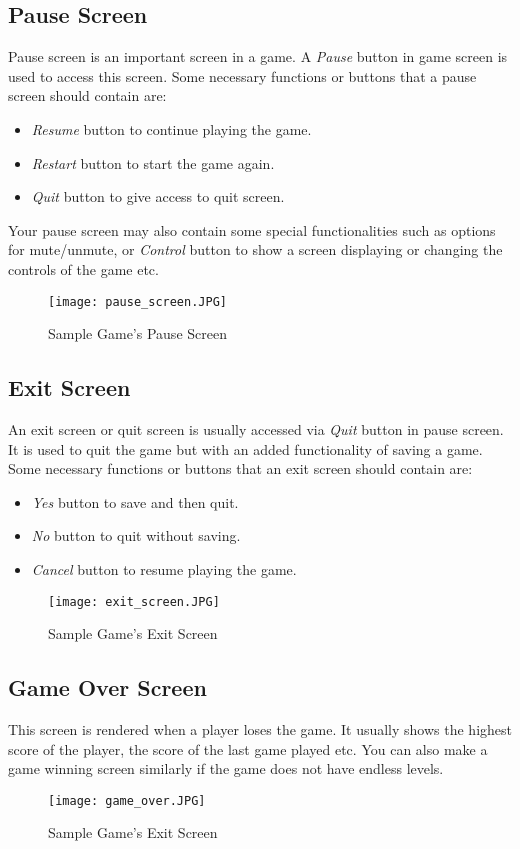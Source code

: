 \documentclass[11pt,fleqn]{book} %
\begin{document}
\subsection{Pause Screen}
Pause screen is an important screen in a game. A \textit{Pause} button in game screen is used to access this screen. Some necessary functions or buttons that a pause screen should contain are: 
\begin{itemize}
\item \textit{Resume} button to continue playing the game.
\item \textit{Restart} button to start the game again.
\item \textit{Quit} button to give access to quit screen.
\end{itemize}
Your pause screen may also contain some special functionalities such as options for mute/unmute, or \textit{Control} button to show a screen displaying or changing the controls of the game etc.
\begin{figure}[ht]
            \centering
            \texttt{[image: pause\_screen.JPG]}
            \caption{Sample Game's Pause Screen}
            \label{fig:my_label}
\end{figure} 
\subsection{Exit Screen}
An exit screen or quit screen is usually accessed via \textit{Quit} button in pause screen. It is used to quit the game but with an added functionality of saving a game.  Some necessary functions or buttons that an exit screen should contain are: 
\begin{itemize}
\item \textit{Yes} button to save and then quit.
\item \textit{No} button to quit without saving.
\item \textit{Cancel} button to resume playing the game.
\end{itemize}
\begin{figure}[ht]
            \centering
            \texttt{[image: exit\_screen.JPG]}
            \caption{Sample Game's Exit Screen}
            \label{fig:my_label}
\end{figure} 
\subsection{Game Over Screen}
This screen is rendered when a player loses the game. It usually shows the highest score of the player, the score of the last game played etc. You can also make a game winning screen similarly if the game does not have endless levels.
\begin{figure}[ht]
            \centering
            \texttt{[image: game\_over.JPG]}
            \caption{Sample Game's Exit Screen}
            \label{fig:my_label}
\end{figure} 
\end{document}
